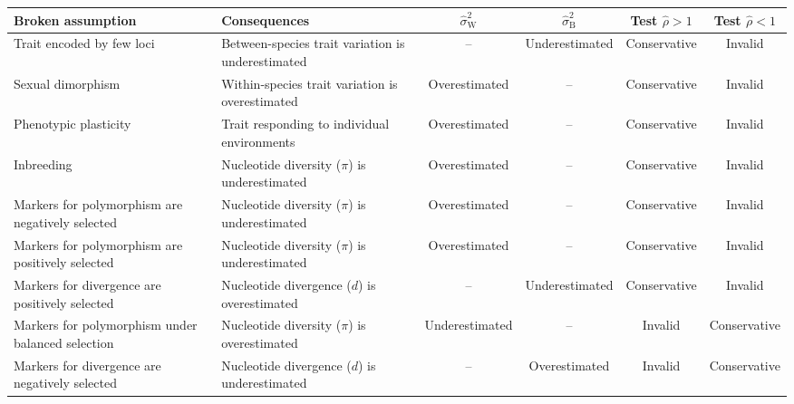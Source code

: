 \documentclass{article}
\newcommand{\RateBetween}{\sigma^2_{\mathrm{B}}}
\newcommand{\RateWhithin}{\sigma^2_{\mathrm{W}}}
\newcommand{\EstRateBetween}{\widehat{\sigma}^2_{\mathrm{B}}}
\newcommand{\EstRateWhithin}{\widehat{\sigma}^2_{\mathrm{W}}}
\newcommand{\NI}{\rho}
\newcommand{\EstNI}{\widehat{\rho}}
\providecommand{\DIFaddtex}[1]{{\protect\color{blue}\uwave{#1}}} %
\providecommand{\DIFdeltex}[1]{{\protect\color{red}\sout{#1}}}                      %
\providecommand{\DIFaddFL}[1]{\DIFadd{#1}} %
\providecommand{\DIFdelFL}[1]{\DIFdel{#1}} %
\providecommand{\DIFaddbeginFL}{} %
\providecommand{\DIFaddendFL}{} %
\providecommand{\DIFdelbeginFL}{} %
\providecommand{\DIFdelendFL}{} %
\providecommand{\DIFadd}[1]{\texorpdfstring{\DIFaddtex{#1}}{#1}} %
\providecommand{\DIFdel}[1]{\texorpdfstring{\DIFdeltex{#1}}{}} %
\newcommand{\DIFscaledelfig}{0.5}
\newlength{\DIFdelgraphicswidth} %
\newlength{\DIFdelgraphicsheight} %
\newcommand{\DIFaddincludegraphics}[2][]{{\color{blue}\fbox{\DIFOincludegraphics[#1]{#2}}}} %
\newcommand{\DIFdelincludegraphics}[2][]{%
\sbox{\DIFdelgraphicsbox}{\DIFOincludegraphics[#1]{#2}}%
\settoboxwidth{\DIFdelgraphicswidth}{\DIFdelgraphicsbox} %
\settoboxtotalheight{\DIFdelgraphicsheight}{\DIFdelgraphicsbox} %
\scalebox{\DIFscaledelfig}{%
\parbox[b]{\DIFdelgraphicswidth}{\usebox{\DIFdelgraphicsbox}\\[-\baselineskip] \rule{\DIFdelgraphicswidth}{0em}}\llap{\resizebox{\DIFdelgraphicswidth}{\DIFdelgraphicsheight}{%
\setlength{\unitlength}{\DIFdelgraphicswidth}%
\begin{picture}(1,1)%
\thicklines\linethickness{2pt} %
{\color[rgb]{1,0,0}\put(0,0){\framebox(1,1){}}}%
{\color[rgb]{1,0,0}\put(0,0){\line( 1,1){1}}}%
{\color[rgb]{1,0,0}\put(0,1){\line(1,-1){1}}}%
\end{picture}%
}\hspace*{3pt}}} %
} %
\DeclareRobustCommand{\DIFaddbeginFL}{\DIFOaddbeginFL \let\includegraphics\DIFaddincludegraphics} %
\DeclareRobustCommand{\DIFaddendFL}{\DIFOaddendFL \let\includegraphics\DIFOincludegraphics} %
\DeclareRobustCommand{\DIFdelbeginFL}{\DIFOdelbeginFL \let\includegraphics\DIFdelincludegraphics} %
\DeclareRobustCommand{\DIFdelendFL}{\DIFOaddendFL \let\includegraphics\DIFOincludegraphics} %
\begin{document}
\begin{table}[t!]
    \centering
    \begin{adjustbox}{width = 1.0\textwidth}
        \begin{tabular}{||l|l||c|c||c|c||}
            \hline
            Broken assumption                                       & Consequences                                       & \DIFdelbeginFL \DIFdelFL{$\EstRateWhithin$   }\DIFdelendFL \DIFaddbeginFL \DIFaddFL{$\RateWhithin$   }\DIFaddendFL & \DIFdelbeginFL \DIFdelFL{$\EstRateBetween$   }\DIFdelendFL \DIFaddbeginFL \DIFaddFL{$\RateBetween$   }\DIFaddendFL & Test \DIFdelbeginFL \DIFdelFL{$\EstNI > 1$ }\DIFdelendFL \DIFaddbeginFL \DIFaddFL{$\NI > 1$ }\DIFaddendFL & Test \DIFdelbeginFL \DIFdelFL{$\EstNI < 1$ }\DIFdelendFL \DIFaddbeginFL \DIFaddFL{$\NI < 1$ }\DIFaddendFL \\ \hline \hline
            Trait encoded by few loci                        & Between-species trait variation is underestimated & --              & Underestimated & Conservative & Invalid  \\ \hline
            Sexual dimorphism                                & Within-species trait variation is overestimated   & Overestimated & -- & Conservative & Invalid  \\ \hline
            Phenotypic plasticity & Trait responding to individual environments  & Overestimated & -- & Conservative & Invalid  \\ \hline
            Inbreeding                                       & Nucleotide diversity ($\pi$) is underestimated    & Overestimated  & --              & Conservative & Invalid  \\ \hline
            Markers for polymorphism are negatively selected & Nucleotide diversity ($\pi$) is underestimated  & Overestimated & -- & Conservative & Invalid  \\ \hline
            Markers for polymorphism are positively selected & Nucleotide diversity ($\pi$) is underestimated  & Overestimated & -- & Conservative & Invalid  \\ \hline
            Markers for divergence are positively selected   & Nucleotide divergence ($d$) is overestimated & -- & Underestimated & Conservative & Invalid  \\ \hline
            Markers for polymorphism under balanced selection & Nucleotide diversity ($\pi$) is overestimated  & Underestimated & -- & Invalid & Conservative  \\ \hline
            Markers for divergence are negatively selected   & Nucleotide divergence ($d$) is underestimated & -- & Overestimated & Invalid & Conservative  \\ \hline

\end{tabular}
\end{adjustbox}
\end{table}
\end{document}

